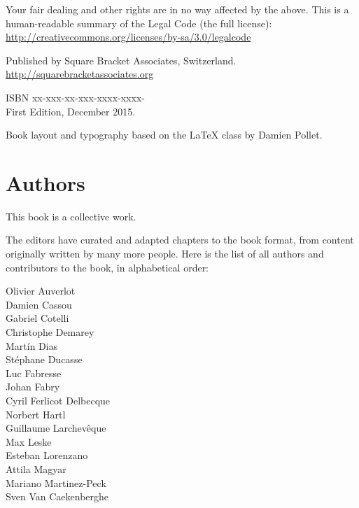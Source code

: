 \documentclass[10pt,twoside,english,showtrims]{support/latex/sbabook/sbabook}
\begin{document}
{  Your fair dealing and other rights are in no way affected by the
  above. This is a human-readable summary of the Legal Code (the full
  license): \\
  \url{http://creativecommons.org/licenses/by-sa/3.0/legalcode}

  \vfill

  Published by Square Bracket Associates, Switzerland. \\
  \url{http://squarebracketassociates.org} \\ \smallskip

  ISBN xx-xxx-xx-xxx-xxxx-xxxx- \\
  First Edition, December 2015. \\ \smallskip

  Book layout and typography based on the  \LaTeX{} class by Damien Pollet.
}


\frontmatter
\chapter*{Authors}

This book is a collective work.

The editors have curated and adapted chapters to the book format, from content
originally written by many more people. Here is the list of all authors and
contributors to the book, in alphabetical order:

\begin{multicols}{2}
Olivier Auverlot\\
Damien Cassou\\
Gabriel Cotelli\\
Christophe Demarey\\
Martín Dias\\
Stéphane Ducasse\\
Luc Fabresse\\
Johan Fabry\\
Cyril Ferlicot Delbecque\\
Norbert Hartl\\
Guillaume Larchevêque\\
Max Leske\\
Esteban Lorenzano\\
Attila Magyar\\
Mariano Martinez-Peck\\
Sven Van Caekenberghe\\
\end{multicols}

\tableofcontents
\end{document}
